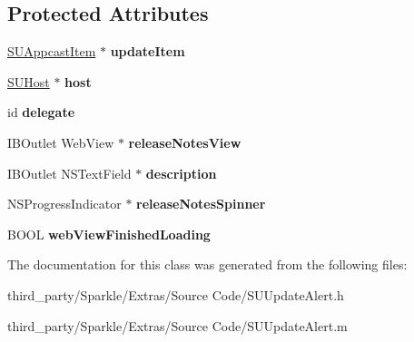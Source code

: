 \subsection*{Protected Attributes}
\begin{DoxyCompactItemize}
\item 
\mbox{\label{interface_s_u_update_alert_a6a06159e78e627ea6d06539b3fafc368}} 
\mbox{\hyperlink{interface_s_u_appcast_item}{S\+U\+Appcast\+Item}} $\ast$ {\bfseries update\+Item}
\item 
\mbox{\label{interface_s_u_update_alert_a8004474512f18e8d71ba4e02488779c4}} 
\mbox{\hyperlink{interface_s_u_host}{S\+U\+Host}} $\ast$ {\bfseries host}
\item 
\mbox{\label{interface_s_u_update_alert_ab2e3b01b45201f3a65696e07ed27960d}} 
id {\bfseries delegate}
\item 
\mbox{\label{interface_s_u_update_alert_a7f3b548e2aced2099d58be47ae7985b2}} 
I\+B\+Outlet Web\+View $\ast$ {\bfseries release\+Notes\+View}
\item 
\mbox{\label{interface_s_u_update_alert_a44675603eff37a5fe4050af3aef3ff24}} 
I\+B\+Outlet N\+S\+Text\+Field $\ast$ {\bfseries description}
\item 
\mbox{\label{interface_s_u_update_alert_a0724ac37754dcd0dd0af807c9743d441}} 
N\+S\+Progress\+Indicator $\ast$ {\bfseries release\+Notes\+Spinner}
\item 
\mbox{\label{interface_s_u_update_alert_a8753fb90be472e18bfcc28b0070d5f5f}} 
B\+O\+OL {\bfseries web\+View\+Finished\+Loading}
\end{DoxyCompactItemize}


The documentation for this class was generated from the following files\+:\begin{DoxyCompactItemize}
\item 
third\+\_\+party/\+Sparkle/\+Extras/\+Source Code/S\+U\+Update\+Alert.\+h\item 
third\+\_\+party/\+Sparkle/\+Extras/\+Source Code/S\+U\+Update\+Alert.\+m\end{DoxyCompactItemize}
